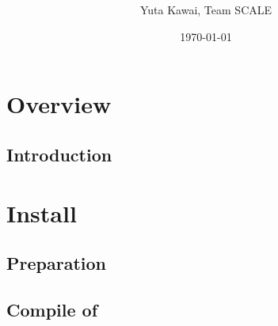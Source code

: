\documentclass[a4paper]{report}
\title{{\vspace{2cm}{\Large Version \version} }}
\author{\Large Yuta Kawai, Team SCALE}
\date{\today}
\begin{document}
\maketitle
\ClearWallPaper
{}
\tableofcontents


\part{Overview} \label{part:overview}
 \chapter{Introduction} \label{sec:introduction}

\part{Install} \label{part:install}
 \chapter{Preparation}
 \chapter{Compile of \scaledg}
\end{document}
